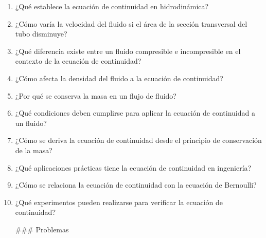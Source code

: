 \documentclass[../main]{subfiles}
\begin{document}
\begin{enumerate}
    \item ¿Qué establece la ecuación de continuidad en hidrodinámica?
    \item ¿Cómo varía la velocidad del fluido si el área de la sección transversal del tubo disminuye?
    \item ¿Qué diferencia existe entre un fluido compresible e incompresible en el contexto de la ecuación de continuidad?
    \item ¿Cómo afecta la densidad del fluido a la ecuación de continuidad?
    \item ¿Por qué se conserva la masa en un flujo de fluido?
    \item ¿Qué condiciones deben cumplirse para aplicar la ecuación de continuidad a un fluido?
    \item ¿Cómo se deriva la ecuación de continuidad desde el principio de conservación de la masa?
    \item ¿Qué aplicaciones prácticas tiene la ecuación de continuidad en ingeniería?
    \item ¿Cómo se relaciona la ecuación de continuidad con la ecuación de Bernoulli?
    \item ¿Qué experimentos pueden realizarse para verificar la ecuación de continuidad?

### Problemas


\end{enumerate}
\end{document}
